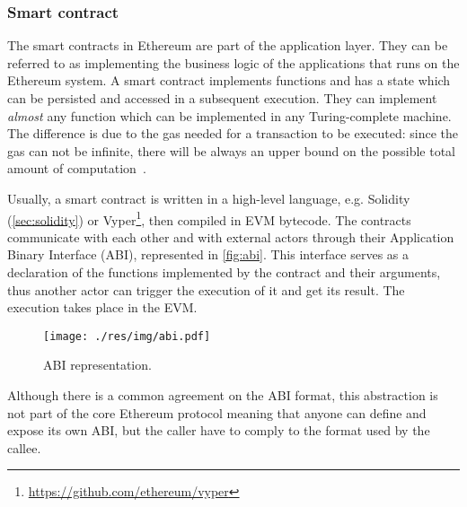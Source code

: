 \subsubsection{Smart contract}
\label{sec:smart-contract}

The smart contracts in Ethereum are part of the application layer. They can be
referred to as implementing the business logic of the applications that runs on
the Ethereum system. A smart contract implements functions and has a state which
can be persisted and accessed in a subsequent execution. They can implement
\emph{almost} any function which can be implemented in any Turing-complete
machine. The difference is due to the gas needed for a transaction to be
executed: since the gas can not be infinite, there will be always an upper
bound on the possible total amount of computation~\cite{wood2018ethereum}.

Usually, a smart contract is written in a high-level language, e.g.
Solidity
(\autoref{sec:solidity}) or
Vyper\footnote{\url{https://github.com/ethereum/vyper}}, then compiled in EVM
bytecode. The contracts communicate with each other and with external actors
through their Application Binary Interface (ABI), represented in
\autoref{fig:abi}. This interface serves as a declaration of the functions
implemented by the contract and their arguments, thus another actor can trigger
the execution of it and get its result. The execution takes place in the EVM.

\begin{figure}
	\begin{center}
		\texttt{[image: ./res/img/abi.pdf]}
	\end{center}
	\caption{ABI representation.}
	\label{fig:abi}
\end{figure}

Although there is a common agreement on the ABI format, this abstraction is not
part of the core Ethereum protocol meaning that anyone can define and expose its
own ABI, but the caller have to comply to the format used by the callee.

